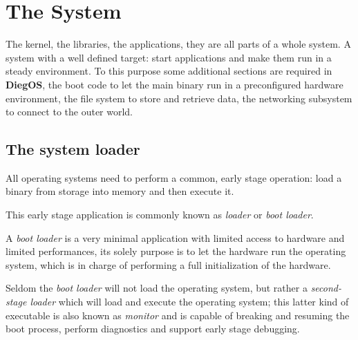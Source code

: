 \documentclass[11pt,b5paper]{scrbook}
\newcommand{\myOS}{{\color{SteelBlue}\textbf{DiegOS}}}
\begin{document}
\chapter{The System}
\newpage
The kernel, the libraries, the applications, they are all parts of a whole
system. A system with a well defined target: start applications and make them
run in a steady environment.
To this purpose some additional sections are required in {\myOS}, the
boot code to let the main binary run in a preconfigured hardware environment,
the file system to store and retrieve data, the networking subsystem to
connect to the outer world.

\section{The system loader}
All operating systems need to perform a common, early stage operation: load a binary from storage
into memory and then execute it.

This early stage application is commonly known as \textit{loader} or \textit{boot loader}.

A \textit{boot loader} is a very minimal application with limited access to hardware and limited performances,
its solely purpose is to let the hardware run the operating system, which is in charge of performing a full initialization
of the hardware.

Seldom the \textit{boot loader} will not load the operating system, but rather a \textit{second-stage loader} which will load
and execute the operating system; this latter kind of executable is also known as \textit{monitor} and is capable
of breaking and resuming the boot process, perform diagnostics and support early stage debugging.

\medskip
{}
\medskip
\end{document}
